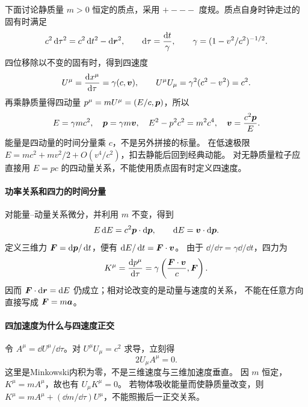 下面讨论静质量 $m>0$ 恒定的质点，采用 $+---$ 度规。质点自身时钟走过的固有时满足
\[
 c^2\mathop{}\!\mathrm d\tau^2=c^2\mathop{}\!\mathrm d t^2-\mathop{}\!\mathrm d\bm{r}^2,
 \qquad \mathop{}\!\mathrm d\tau=\frac{\mathop{}\!\mathrm d t}{\gamma},\qquad
 \gamma=(1-v^2/c^2)^{-1/2}.
\]
四位移除以不变的固有时，得到四速度
\[
 U^\mu=\frac{\mathop{}\!\mathrm d x^\mu}{\mathop{}\!\mathrm d\tau}=\gamma(c,\bm{v}),
 \qquad U^\mu U_\mu=\gamma^2(c^2-v^2)=c^2.
\]
再乘静质量得四动量 $p^\mu=mU^\mu=(E/c,\bm{p})$，所以
\[
 E=\gamma mc^2,\quad \bm{p}=\gamma m\bm{v},\quad
 E^2-p^2c^2=m^2c^4,\quad \bm{v}=\frac{c^2\bm{p}}{E}.
\]
能量是四动量的时间分量乘 $c$，不是另外拼接的标量。
在低速极限 $E=mc^2+mv^2/2+O(v^4/c^2)$，扣去静能后回到经典动能。
对无静质量粒子应直接用 $E=pc$ 的四动量关系，不能使用质点固有时定义四速度。

\paragraph{功率关系和四力的时间分量}
对能量--动量关系微分，并利用 $m$ 不变，得到
\[
 E\mathop{}\!\mathrm d E=c^2\bm{p}\cdot\mathop{}\!\mathrm d\bm{p},
 \qquad \mathop{}\!\mathrm d E=\bm{v}\cdot\mathop{}\!\mathrm d\bm{p}.
\]
定义三维力 $\bm{F}=\mathop{}\!\mathrm d\bm{p}/\mathop{}\!\mathrm d t$，便有
$\mathop{}\!\mathrm d E/\mathop{}\!\mathrm d t=\bm{F}\cdot\bm{v}$。
由于 $\dd/\dd\tau=\gamma\dd/\dd t$，四力为
\[
 K^\mu=\frac{\mathop{}\!\mathrm d p^\mu}{\mathop{}\!\mathrm d\tau}
 =\gamma\left(\frac{\bm{F}\cdot\bm{v}}{c},\bm{F}\right).
\]
因而 $\bm{F}\cdot\mathop{}\!\mathrm d\bm{r}=\mathop{}\!\mathrm d E$ 仍成立；相对论改变的是动量与速度的关系，
不能在任意方向直接写成 $\bm{F}=m\bm{a}$。

\paragraph{四加速度为什么与四速度正交}
令 $A^\mu=\dd U^\mu/\dd\tau$。对 $U^\mu U_\mu=c^2$ 求导，立刻得
\[
 2U_\mu A^\mu=0.
\]
这里是Minkowski内积为零，不是三维速度与三维加速度垂直。
因 $m$ 恒定，$K^\mu=mA^\mu$，故也有 $U_\mu K^\mu=0$。
若物体吸收能量而使静质量改变，则
$K^\mu=mA^\mu+(\dd m/\dd\tau)U^\mu$，不能照搬后一正交关系。

